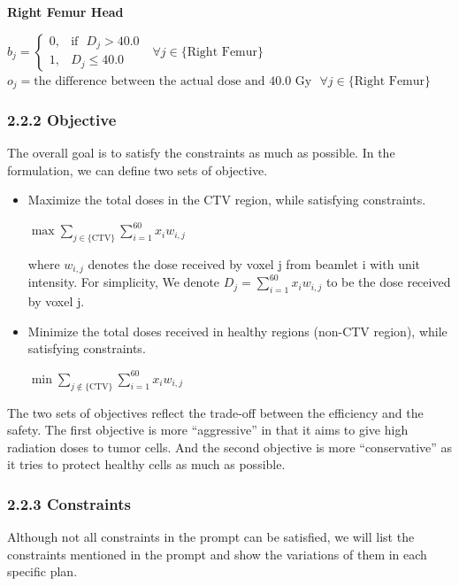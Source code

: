 \documentclass{report}
\begin{document}
\textbf{Right Femur Head}
\begin{center}
    $b_j= 
\begin{cases}
    0,& \text{if}~~~ D_j > 40.0\\
    1,              & D_j \leq 40.0
\end{cases} ~~~\forall j \in \{\text{Right Femur}\}$\\

    $o_j = \text{the difference between the actual dose and 40.0 Gy} ~~~ \forall j \in \{\text{Right Femur}\}$
\end{center}



\subsubsection{2.2.2 Objective}
The overall goal is to satisfy the constraints as much as possible. In the formulation, we can define two sets of objective.
\begin{itemize}
    \item Maximize the total doses in the CTV region, while satisfying constraints.
    \begin{center}
        $\max \sum_{j \in \{\text{CTV} \}}\sum_{i = 1}^{60} x_iw_{i,j}$
    \end{center}
    where $w_{i,j}$ denotes the dose received by voxel j from beamlet i with unit intensity. For simplicity, We denote $D_j = \sum_{i = 1}^{60} x_iw_{i,j}$ to be the dose received by voxel j.
    
    \item Minimize the total doses received in healthy regions (non-CTV region), while satisfying constraints.
    \begin{center}
        $\min \sum_{j \notin \{\text{CTV} \}}\sum_{i = 1}^{60} x_iw_{i,j}$
    \end{center}
\end{itemize}

The two sets of objectives reflect the trade-off between the efficiency and the safety. The first objective is more ``aggressive'' in that it aims to give high radiation doses to tumor cells. And the second objective is more ``conservative'' as it tries to protect healthy cells as much as possible.

\subsubsection{2.2.3 Constraints}
Although not all constraints in the prompt can be satisfied, we will list the constraints mentioned in the prompt and show the variations of them in each specific plan.\\
\end{document}
